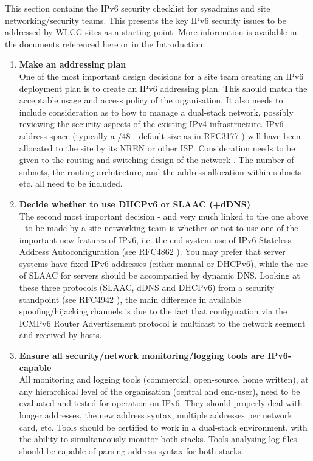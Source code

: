 
This section contains the IPv6 security checklist for sysadmins and site
networking/security teams. This presents the key IPv6 security issues to be
addressed by WLCG sites as a starting point. More information is available in
the documents referenced here or in the Introduction. 



\begin{enumerate}


\item {\bf Make an addressing plan}\\
One of the most important design decisions for a site team creating
an IPv6 deployment plan is to create an IPv6 addressing plan.
This should match the acceptable usage and access policy of the organisation.
It also needs to include consideration as to how to manage a dual-stack network,
possibly reviewing the security aspects of the existing IPv4 infrastructure.
IPv6 address space (typically a /48 - default size as in RFC3177 \cite{rfc})
will have been allocated to the site by its NREN or other ISP. Consideration
needs to be given to the routing and switching design of the network
\cite{planningguides}. The number of subnets, the routing architecture,
and the address allocation within subnets etc. all need to be included. 


\item {\bf Decide whether to use DHCPv6 or SLAAC (+dDNS)} \\
The second most important decision - and very much linked to the one above -
to be made by a site networking team is whether or not to use one of the important
new features of IPv6, i.e. the end-system use of  IPv6 Stateless Address
Autoconfiguration (see RFC4862 \cite{rfc}).
You may prefer that server systems have fixed IPv6 addresses
(either manual or DHCPv6), while the use of SLAAC for servers
should be accompanied by
dynamic DNS. Looking at these three protocols (SLAAC, dDNS and DHCPv6) from a
security standpoint (see RFC4942 \cite{rfc}), the main difference in available
spoofing/hijacking channels is due to the fact that configuration via the ICMPv6
Router Advertisement protocol is multicast to the network segment and received
by hosts.


\item {\bf Ensure all security/network monitoring/logging tools are IPv6-capable}\\
All monitoring and logging tools (commercial, open-source, home written),
at any hierarchical level of the organisation (central and end-user),
need to be evaluated and tested for operation on IPv6.
They should properly deal with longer addresses, the new address syntax, multiple
addresses per network card, etc.
Tools should be certified to work in a dual-stack environment, with the
ability to simultaneously monitor both stacks. Tools analysing log files
should be capable of parsing address syntax for both stacks.


\end{enumerate}
